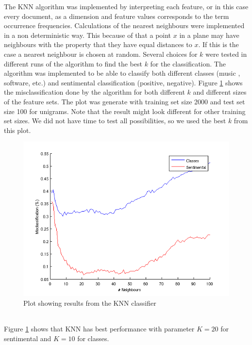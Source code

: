 The KNN algorithm was implemented by interpreting each feature, or in this case
every document, as a dimension and feature values corresponds to the term
occurrence frequencies. Calculations of the nearest neighbours were
implemented in a non deterministic way. This because of that a point $x$ in a plane
may have neighbours with the property that they have equal distances to
$x$. If this is the case a nearest neighbour is chosen at random. Several choices
for $k$ were tested in different runs of the algorithm to find the best $k$ for
the classification. The algorithm was implemented to be able to classify both
different classes (music , software, etc.) and sentimental classification
(positive, negative). Figure \ref{fig:KNNplot} shows the misclassification done by the
algorithm for both different $k$ and different sizes of the feature sets. The plot was generate with training set size 2000 and test set size 100 for unigrams. Note that the result might look different for other training set sizes. We did not have time to test all  possibilities, so we used the best $k$ from this plot.
\begin{figure}[h!]
\centering
\includegraphics[scale=0.6]{../Plottar/knn_2000words_testdata100_unigram}
\caption{Plot showing results from the KNN classifier}
\label{fig:KNNplot}
\end{figure}\\
Figure \ref{fig:KNNplot} shows that KNN has best performance with parameter $K = 20$ for sentimental and $K = 10$ for classes.


